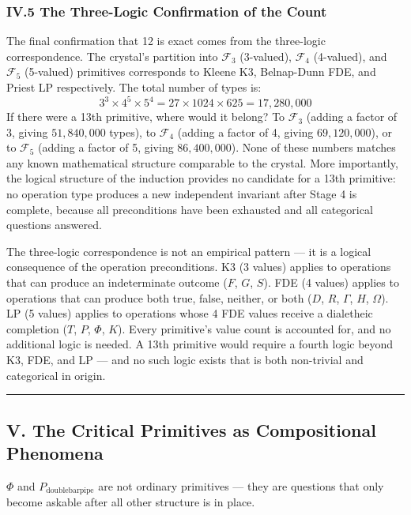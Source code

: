 \documentclass[12pt,a4paper]{article}
\begin{document}
\subsubsection{IV.5 The Three-Logic Confirmation of the Count}
The final confirmation that 12 is exact comes from the three-logic correspondence. The crystal's partition into $\mathcal{F}_3$ (3-valued), $\mathcal{F}_4$ (4-valued), and $\mathcal{F}_5$ (5-valued) primitives corresponds to Kleene K3, Belnap-Dunn FDE, and Priest LP respectively. The total number of types is:
\[
3^3 \times 4^5 \times 5^4 = 27 \times 1024 \times 625 = 17{,}280{,}000
\]
If there were a 13th primitive, where would it belong? To $\mathcal{F}_3$ (adding a factor of 3, giving $51{,}840{,}000$ types), to $\mathcal{F}_4$ (adding a factor of 4, giving $69{,}120{,}000$), or to $\mathcal{F}_5$ (adding a factor of 5, giving $86{,}400{,}000$). None of these numbers matches any known mathematical structure comparable to the crystal. More importantly, the logical structure of the induction provides no candidate for a 13th primitive: no operation type produces a new independent invariant after Stage 4 is complete, because all preconditions have been exhausted and all categorical questions answered.

The three-logic correspondence is not an empirical pattern --- it is a logical consequence of the operation preconditions. K3 (3 values) applies to operations that can produce an indeterminate outcome ($F$, $G$, $S$). FDE (4 values) applies to operations that can produce both true, false, neither, or both ($D$, $R$, $\Gamma$, $H$, $\Omega$). LP (5 values) applies to operations whose 4 FDE values receive a dialetheic completion ($T$, $P$, $\Phi$, $K$). Every primitive's value count is accounted for, and no additional logic is needed. A 13th primitive would require a fourth logic beyond K3, FDE, and LP --- and no such logic exists that is both non-trivial and categorical in origin.

\begin{center}
\rule{0.5\textwidth}{0.4pt}
\end{center}

\subsection{V. The Critical Primitives as Compositional Phenomena}
$\Phi$ and $P_{\text{doublebarpipe}}$ are not ordinary primitives --- they are questions that only become askable after all other structure is in place.
\end{document}

